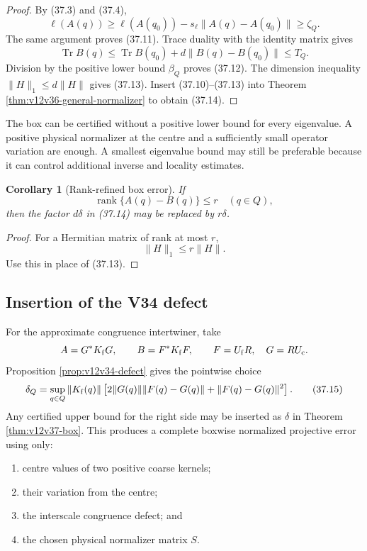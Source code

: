 \documentclass[11pt]{article}
\newtheorem{corollary}[theorem]{Corollary}
\theoremstyle{remark}
\begin{document}
\begin{proof}
By (37.3) and (37.4),
\[
 \ell(A(q))
 \geq
 \ell(A(q_0))-s_\ell\|A(q)-A(q_0)\|
 \geq\zeta_Q.
\]
The same argument proves (37.11).  Trace duality with the identity
matrix gives
\[
 \operatorname{Tr}B(q)
 \leq
 \operatorname{Tr}B(q_0)+d\|B(q)-B(q_0)\|
 \leq T_Q.
\]
Division by the positive lower bound \(\beta_Q\) proves (37.12).
The dimension inequality
\(\|H\|_1\leq d\|H\|\) gives (37.13).  Insert
(37.10)--(37.13) into Theorem
\ref{thm:v12v36-general-normalizer} to obtain (37.14).
\end{proof}

The box can be certified without a positive lower bound for every
eigenvalue.  A positive physical normalizer at the centre and a
sufficiently small operator variation are enough.  A smallest
eigenvalue bound may still be preferable because it can control
additional inverse and locality estimates.

\begin{corollary}[Rank-refined box error]
\label{cor:v12v37-rank}
If
\[
 \operatorname{rank}\{A(q)-B(q)\}\leq r
 \quad(q\in Q),
\]
then the factor \(d\delta\) in (37.14) may be replaced by
\(r\delta\).
\end{corollary}

\begin{proof}
For a Hermitian matrix of rank at most \(r\),
\[
 \|H\|_1\leq r\|H\|.
\]
Use this in place of (37.13).
\end{proof}

\subsection{Insertion of the V34 defect}

For the approximate congruence intertwiner, take
\[
 A=G^*K_{\rm f}G,\qquad B=F^*K_{\rm f}F,
 \qquad
 F=U_{\rm f}R,\quad G=RU_{\rm c}.
\]
Proposition \ref{prop:v12v34-defect} gives the pointwise choice
\begin{equation}
 \delta_Q
 =
 \sup_{q\in Q}
 \|K_{\rm f}(q)\|
 \left[
 2\|G(q)\|\|F(q)-G(q)\|
 +\|F(q)-G(q)\|^2
 \right].                                         \tag{37.15}
\end{equation}
Any certified upper bound for the right side may be inserted as
\(\delta\) in Theorem \ref{thm:v12v37-box}.  This produces a complete
boxwise normalized projective error using only:
\begin{enumerate}
\item centre values of two positive coarse kernels;
\item their variation from the centre;
\item the interscale congruence defect; and
\item the chosen physical normalizer matrix \(S\).
\end{enumerate}
\end{document}

